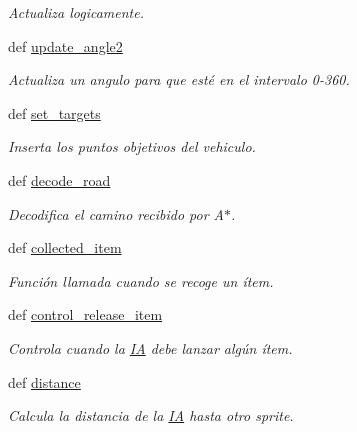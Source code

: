 \begin{DoxyCompactItemize}
\begin{DoxyCompactList}\small\item\em \-Actualiza logicamente. \end{DoxyCompactList}\item 
def \hyperlink{classengine_1_1ia_1_1IA_ac777a9358642e163215ff90ec63515e0}{update\-\_\-angle2}
\begin{DoxyCompactList}\small\item\em \-Actualiza un angulo para que esté en el intervalo 0-\/360. \end{DoxyCompactList}\item 
def \hyperlink{classengine_1_1ia_1_1IA_ad734b09db10f65d8084eff3d6d4dfb5f}{set\-\_\-targets}
\begin{DoxyCompactList}\small\item\em \-Inserta los puntos objetivos del vehiculo. \end{DoxyCompactList}\item 
\hypertarget{classengine_1_1ia_1_1IA_ae74956517cded38f0623386bedd33e98}{
def \hyperlink{classengine_1_1ia_1_1IA_ae74956517cded38f0623386bedd33e98}{decode\-\_\-road}}
\label{classengine_1_1ia_1_1IA_ae74956517cded38f0623386bedd33e98}

\begin{DoxyCompactList}\small\item\em \-Decodifica el camino recibido por \-A$\ast$. \end{DoxyCompactList}\item 
\hypertarget{classengine_1_1ia_1_1IA_ad3d95bfd65c07bed22aab4a24ccdc0c9}{
def \hyperlink{classengine_1_1ia_1_1IA_ad3d95bfd65c07bed22aab4a24ccdc0c9}{collected\-\_\-item}}
\label{classengine_1_1ia_1_1IA_ad3d95bfd65c07bed22aab4a24ccdc0c9}

\begin{DoxyCompactList}\small\item\em \-Función llamada cuando se recoge un ítem. \end{DoxyCompactList}\item 
\hypertarget{classengine_1_1ia_1_1IA_acf0e5b3e210205b9912f96b25e666035}{
def \hyperlink{classengine_1_1ia_1_1IA_acf0e5b3e210205b9912f96b25e666035}{control\-\_\-release\-\_\-item}}
\label{classengine_1_1ia_1_1IA_acf0e5b3e210205b9912f96b25e666035}

\begin{DoxyCompactList}\small\item\em \-Controla cuando la \hyperlink{classengine_1_1ia_1_1IA}{\-I\-A} debe lanzar algún ítem. \end{DoxyCompactList}\item 
def \hyperlink{classengine_1_1ia_1_1IA_afb9882c0be27f17b047b90d48d10ed77}{distance}
\begin{DoxyCompactList}\small\item\em \-Calcula la distancia de la \hyperlink{classengine_1_1ia_1_1IA}{\-I\-A} hasta otro sprite. \end{DoxyCompactList}\end{DoxyCompactItemize}
